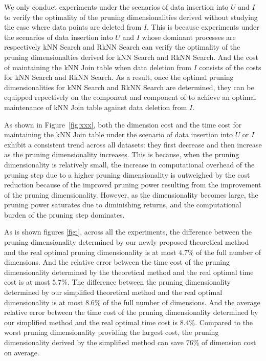 We only conduct experiments under the scenarios of data insertion into $U$ and $I$ to verify the optimality of the pruning dimensionalities derived without studying the case where data points are deleted from $I$. This is because experiments under the scenarios of data insertion into $U$ and $I$ whose dominant processes are respectively kNN Search and RkNN Search can verify the optimality of the pruning dimensionalties derived for kNN Search and RkNN Search. And the cost of maintaining the kNN Join table when data deletion from $I$ consists of the costs for kNN Search and RkNN Search. As a result, once the optimal pruning dimensionalities for kNN Search and RkNN Search are determined, they can be equipped repectively on the \deltatree component and \hdrtree component of \dualtree to achieve an optimal maintenance of kNN Join table against data deletion from $I$.

As shown in Figure~\ref{fig:xxx}, both the dimension cost and the time cost for maintaining the kNN Join table under the scenario of data insertion into $U$ or $I$ exhibit a consistent trend across all datasets: they first decrease and then increase as the pruning dimensionality increases. This is because, when the pruning dimensionality is relatively small, the increase in computational overhead of the pruning step due to a higher pruning dimensionality is outweighed by the cost reduction because of the improved pruning power resulting from the improvement of the pruning dimensionality. However, as the dimensionality becomes large, the pruning power saturates due to diminishing returns, and the computational burden of the pruning step dominates.

As is shown figures \ref{fig:}, across all the experiments, the difference between the pruning dimensionality determined by our newly proposed theoretical method and the real optimal pruning dimensionality is at most $4.7\%$ of the full number of dimensions. And the relative error between the time cost of the pruning dimensionality determined by the theoretical method and the real optimal time cost is at most $5.7\%$. The difference between the pruning dimensionality determined by our simplified theoretical method and the real optimal dimensionality is at most $8.6\%$ of the full number of dimensions. And the average relative error between the time cost of the pruning dimensionality determined by our simplified method and the real optimal time cost is $8.4\%$. Compared to the worst pruning dimensionality providing the largest cost, the pruning dimensionality derived by the simplified method can save $76\%$ of dimension cost on average.

